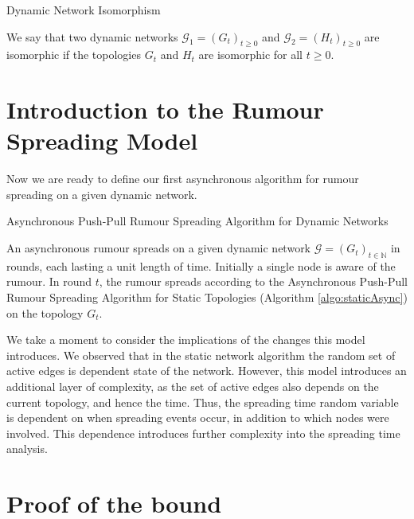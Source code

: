\begin{definition}
	Dynamic Network Isomorphism

	We say that two dynamic networks $\mathcal{G}_1 = (G_t)_{t \geq 0}$ and $\mathcal{G}_2 = (H_t)_{t \geq 0}$ are isomorphic if the topologies $G_t$ and $H_t$ are isomorphic for all $t \geq 0$. 
\end{definition}

\section{Introduction to the Rumour Spreading Model}

Now we are ready to define our first asynchronous algorithm for rumour spreading on a given dynamic network.

\begin{definition}
	Asynchronous Push-Pull Rumour Spreading Algorithm for Dynamic Networks
\end{definition}
\label{NodeCentricAsyncAlgorithm}

\noindent
An asynchronous rumour spreads on a given dynamic network $\mathcal{G} = (G_t)_{t\in \mathbb{N}}$ in rounds, each lasting a unit length of time. Initially a single node is aware of the rumour. In round $t$, the rumour spreads according to the Asynchronous Push-Pull Rumour Spreading Algorithm for Static Topologies (Algorithm \ref{algo:staticAsync}) on the topology $G_t$.

We take a moment to consider the implications of the changes this model introduces. We observed that in the static network algorithm the random set of active edges is dependent state of the network. However, this model introduces an additional layer of complexity, as the set of active edges also depends on the current topology, and hence the time. Thus, the spreading time random variable is dependent on when spreading events occur, in addition to which nodes were involved. This dependence introduces further complexity into the spreading time analysis.


\section{Proof of the bound}

